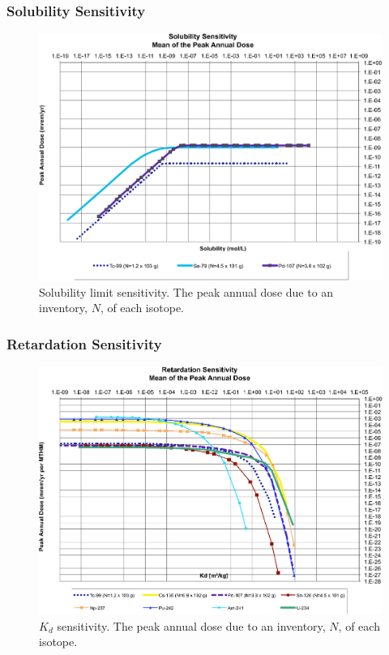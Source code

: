 \begin{frame}[ctb]
\frametitle{Solubility Sensitivity}
\begin{figure}[ht]
  \centering
  \includegraphics[width=\linewidth]{./images/Solubility_Summary.eps}
  \caption{Solubility limit sensitivity. The peak annual dose due to an 
  inventory, 
  $N$, of each isotope.}
  \label{fig:SolSum}
\end{figure}
\end{frame}

\begin{frame}[ctb]
\frametitle{Retardation Sensitivity}
\begin{figure}[ht]
  \centering
  \includegraphics[width=\linewidth]{./images/Partitioning_Summary.eps}
  \caption{$K_d$ sensitivity.  The peak annual dose due to an inventory, 
  $N$, of each isotope.}
  \label{fig:KdSum}
\end{figure}
\end{frame}


